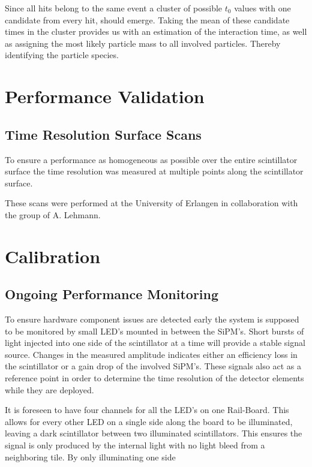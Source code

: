 \documentclass[12pt,a4paper,oneside]{article}
\newcommand{\railboard}{Rail-Board}
\newcommand{\sipms}{SiPM's}
\begin{document}
Since all hits belong to the same event a cluster of possible $t_0$ values with one candidate from every hit, should emerge.
Taking the mean of these candidate times in the cluster provides us with an estimation of the interaction time, as well as assigning the most likely particle mass to all involved particles.
Thereby identifying the particle species.


\section{Performance Validation}

\subsection{Time Resolution Surface Scans}

To ensure a performance as homogeneous as possible over the entire scintillator surface the time resolution was measured at multiple points along the scintillator surface.

These scans were performed at the University of Erlangen in collaboration with the group of A. Lehmann.


\section{Calibration}

\subsection{Ongoing Performance Monitoring}

To ensure hardware component issues are detected early the system is supposed to be monitored by small LED's mounted in between the \sipms .
Short bursts of light injected into one side of the scintillator at a time will provide a stable signal source.
Changes in the measured amplitude indicates either an efficiency loss in the scintillator or a gain drop of the involved \sipms .
These signals also act as a reference point in order to determine the time resolution of the detector elements while they are deployed.

It is foreseen to have four channels for all the LED's on one \railboard .
This allows for every other LED on a single side along the board to be illuminated, leaving a dark scintillator between two illuminated scintillators.
This ensures the signal is only produced by the internal light with no light bleed from a neighboring tile.
By only illuminating one side 
\end{document}
